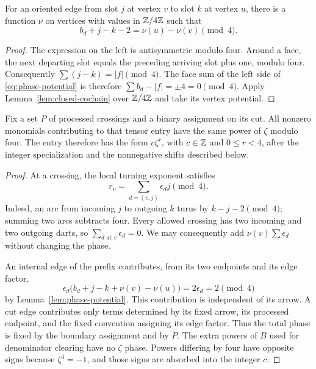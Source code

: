 \begin{lemma}
\label{lem:phase-potential}
For an oriented edge from slot $j$ at vertex $v$ to slot $k$ at vertex $u$,
there is a function $\nu$ on vertices with values in $\mathbb Z/4\mathbb Z$ such that
\begin{equation}\label{eq:phase-potential}
 b_d+j-k-2=\nu(u)-\nu(v)\pmod4.
\end{equation}
\end{lemma}

\begin{proof}
The expression on the left is antisymmetric modulo four. Around a face,
the next departing slot equals the preceding arriving slot plus one,
modulo four. Consequently $\sum(j-k)=|f|\pmod4$. The face sum of the
left side of \eqref{eq:phase-potential} is therefore
$\sum b_d-|f|=\pm4=0\pmod4$. Apply
Lemma~\ref{lem:closed-cochain} over $\mathbb Z/4\mathbb Z$ and take its vertex potential.
\end{proof}

\begin{theorem}
\label{thm:one-phase}
Fix a set $P$ of processed crossings and a binary assignment on its cut.
All nonzero monomials contributing to that tensor entry have the same
power of $\zeta$ modulo four. The entry therefore has the form
$c\zeta^r$, with $c\in\mathbb Z$ and $0\le r<4$, after the integer
specialization and the nonnegative shifts described below.
\end{theorem}

\begin{proof}
At a crossing, the local turning exponent satisfies
\[
 r_v=\sum_{d=(v,j)}\epsilon_d j\pmod4.
\]
Indeed, an arc from incoming $j$ to outgoing $k$ turns by
$k-j-2\pmod4$; summing two arcs subtracts four.
Every allowed crossing has two incoming and two outgoing darts, so
$\sum_{d\text{ at }v}\epsilon_d=0$. We may consequently add
$\nu(v)\sum\epsilon_d$ without changing the phase.

An internal edge of the prefix contributes, from its two endpoints and
its edge factor,
\[
 \epsilon_d\bigl(b_d+j-k+\nu(v)-\nu(u)\bigr)
       =2\epsilon_d=2\pmod4
\]
by Lemma~\ref{lem:phase-potential}. This contribution is independent of
its arrow. A cut edge contributes only terms determined by its fixed
arrow, its processed endpoint, and the fixed convention assigning its
edge factor. Thus the total phase is fixed by the boundary assignment and
by $P$. The extra powers of $B$ used for denominator clearing have no
$\zeta$ phase. Powers differing by four have opposite signs because
$\zeta^4=-1$, and those signs are absorbed into the integer $c$.
\end{proof}

